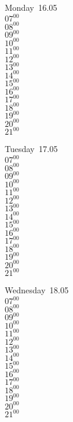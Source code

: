 \documentclass[11pt,a4paper]{book}\usepackage[]{graphicx}\usepackage[]{color}
\begin{document}
\begin{headerbox}
\end{headerbox}
\begin{weekdaybox}
  Monday~16.05\\
  { 
  \vfill
  $07^{00}$\\
$08^{00}$\\
$09^{00}$\\
$10^{00}$\\
$11^{00}$\\
$12^{00}$\\
$13^{00}$\\
$14^{00}$\\
$15^{00}$\\
$16^{00}$\\
$17^{00}$\\
$18^{00}$\\
$19^{00}$\\
$20^{00}$\\
$21^{00}$\\
  }
\end{weekdaybox}
\begin{weekdaybox}
  Tuesday~17.05\\
  { 
  \vfill
  $07^{00}$\\
$08^{00}$\\
$09^{00}$\\
$10^{00}$\\
$11^{00}$\\
$12^{00}$\\
$13^{00}$\\
$14^{00}$\\
$15^{00}$\\
$16^{00}$\\
$17^{00}$\\
$18^{00}$\\
$19^{00}$\\
$20^{00}$\\
$21^{00}$\\
  }
\end{weekdaybox}
\begin{weekdaybox}
  Wednesday~18.05\\
  { 
  \vfill
  $07^{00}$\\
$08^{00}$\\
$09^{00}$\\
$10^{00}$\\
$11^{00}$\\
$12^{00}$\\
$13^{00}$\\
$14^{00}$\\
$15^{00}$\\
$16^{00}$\\
$17^{00}$\\
$18^{00}$\\
$19^{00}$\\
$20^{00}$\\
$21^{00}$\\
  }
\end{weekdaybox}
\end{document}
